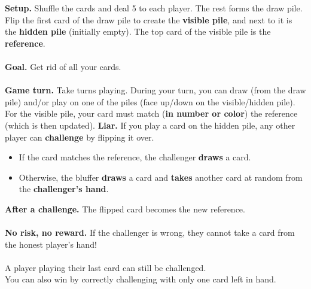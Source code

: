 \documentclass[a4paper]{memoir}
\begin{document}
{\footnotesize

\noindent
\textbf{ Setup.} Shuffle the cards and deal 5 to each player. 
The rest forms the draw pile.
Flip the first card of the draw pile to create the \textbf{visible pile}, and next to it is the \textbf{hidden pile} (initially empty). 
The top card of the visible pile is the \textbf{reference}.
\\
\\
\noindent
\textbf{ Goal.} Get rid of all your cards.
\\
\\
\noindent
\textbf{ Game turn.} Take turns playing. 
During your turn, you can draw (from the draw pile) and/or play on one of the piles (face up/down on the visible/hidden pile).
For the visible pile, your card must match (\textbf{in number or color}) the reference (which is then updated).
\newpage
\noindent
\textbf{ Liar.} If you play a card on the hidden pile, any other player can \textbf{challenge} by flipping it over.
\begin{itemize}
\item If the card matches the reference, the challenger \textbf{draws} a card.
\item Otherwise, the bluffer \textbf{draws} a card and \textbf{takes} another card at random from the \textbf{challenger’s hand}.
\end{itemize}
\textbf{ After a challenge.} The flipped card becomes the new reference.
\\
\\
\textbf{ No risk, no reward.} If the challenger is wrong, they cannot take a card from the honest player’s hand!
\\
\\
\noindent
{} A player playing their last card can still be challenged.
\\
\noindent
{} You can also win by correctly challenging with only one card left in hand.
}
\end{document}
